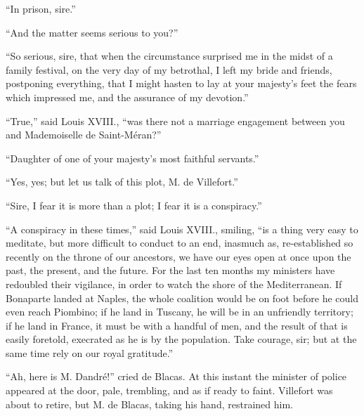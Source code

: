 “In prison, sire.”

“And the matter seems serious to you?”

“So serious, sire, that when the circumstance surprised me in the midst
of a family festival, on the very day of my betrothal, I left my bride
and friends, postponing everything, that I might hasten to lay at your
majesty’s feet the fears which impressed me, and the assurance of my
devotion.”

“True,” said Louis XVIII., “was there not a marriage engagement between
you and Mademoiselle de Saint-Méran?”

“Daughter of one of your majesty’s most faithful servants.”

“Yes, yes; but let us talk of this plot, M. de Villefort.”

“Sire, I fear it is more than a plot; I fear it is a conspiracy.”

“A conspiracy in these times,” said Louis XVIII., smiling, “is a thing
very easy to meditate, but more difficult to conduct to an end,
inasmuch as, re-established so recently on the throne of our ancestors,
we have our eyes open at once upon the past, the present, and the
future. For the last ten months my ministers have redoubled their
vigilance, in order to watch the shore of the Mediterranean. If
Bonaparte landed at Naples, the whole coalition would be on foot before
he could even reach Piombino; if he land in Tuscany, he will be in an
unfriendly territory; if he land in France, it must be with a handful
of men, and the result of that is easily foretold, execrated as he is
by the population. Take courage, sir; but at the same time rely on our
royal gratitude.”

“Ah, here is M. Dandré!” cried de Blacas. At this instant the minister
of police appeared at the door, pale, trembling, and as if ready to
faint. Villefort was about to retire, but M. de Blacas, taking his
hand, restrained him.

